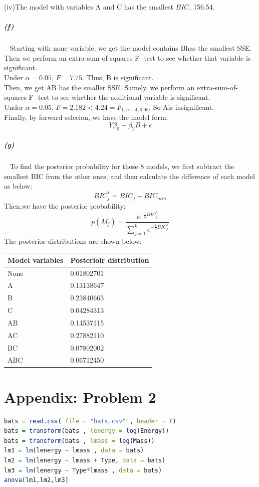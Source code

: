 \documentclass[12pt,a4paper]{article}
\begin{document}
(iv)The model with variables A and C has the smallest $BIC$, 156.54.\\
\subparagraph{(f)}~{}
\newline
Starting with none variable, we get the model contains Bhas the smallest SSE. Then we perform an extra-sum-of-squares F -test to see whether that variable is signiﬁcant.\\
\newline
Under $\alpha = 0.05$, $F =7.75$. Thus, B is significant. \\
\newline
Then, we get AB has the smaller SSE. Samely, we perform an extra-sum-of-squares F -test to see whether the additional variable is signiﬁcant. \\
\newline
Under $\alpha = 0.05$, $F = 2.182 < 4.24 = F_{1, n - 4, 0.05}$. So Ais insignificant.\\
\newline
Finally, by forward selecion, we have the model form:\[Y  \beta_0 + \beta_2B + \epsilon\]
\subparagraph{(g)}~{}
To find the posterior probability for these 8 models, we first subtract the smallest BIC from the other ones, and then calculate the difference of each model as below:\[BIC^*_j = BIC_j - BIC_{min}\]
Then,we have the posterior probability:
\[p(M_j) = \frac{e^{-\frac{1}{2}BIC^*_j}}{\sum^k_{j = 1}e^{-\frac{1}{2}BIC^*_j}}\]
The posterior distributions are shown below:
\begin{center}
\begin{tabular}{|l|l|}
\hline
Model variables &  Posterioir distribution \\ \hline
None            &    0.01802701    \\ \hline
A               & 0.13138647         \\ \hline
B               & 0.23840663       \\ \hline
C               & 0.04284313     \\ \hline
AB              & 0.14537115     \\ \hline
AC              & 0.27882110    \\ \hline
BC              & 0.07802002    \\ \hline
ABC             & 0.06712450   \\ \hline
\end{tabular}
\end{center}
\appendix
\section{Appendix: Problem 2}
\begin{lstlisting}[language = R]
bats = read.csv( file = "bats.csv" , header = T) 
bats = transform(bats , lenergy = log(Energy)) 
bats = transform(bats , lmass = log(Mass)) 
lm1 = lm(lenergy ~ lmass , data = bats) 
lm2 = lm(lenergy ~ lmass + Type, data = bats) 
lm3 = lm(lenergy ~ Type*lmass , data = bats)
anova(lm1,lm2,lm3)
\end{lstlisting}
\end{document}
